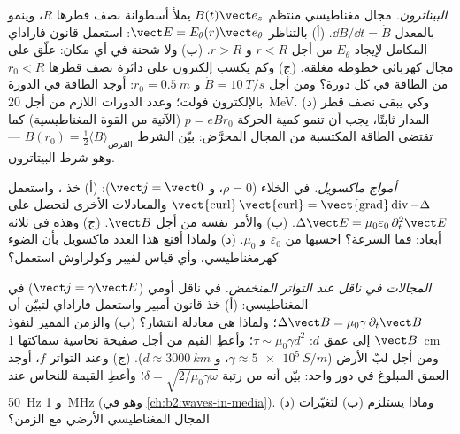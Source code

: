 \begin{exercise}[$\star\star\star$]\label{exo:b2:maxwell-equations:10}
\emph{البيتاترون.} مجال مغناطيسي منتظم $B(t)\vect e_z$ يملأ
أسطوانة نصف قطرها $R$، وينمو بالمعدل $\dd B/\dd t = \dot B$. (أ) بالتناظر
$\vect E = E_\theta(r)\vect e_\theta$: استعمل قانون فاراداي المكامل لإيجاد $E_\theta$
من أجل $r < R$ و $r > R$. (ب) ولا شحنة في أي مكان: علّق على
مجال كهربائي خطوطه مغلقة. (ج) وكم يكسب إلكترون على دائرة
نصف قطرها $r_0 < R$ من الطاقة في كل دورة؟ ومن أجل $\dot B = \qty{10}{T/s}$
و $r_0 = \qty{0.5}{m}$: أوجد الطاقة في الدورة بالإلكترون فولت؛ وعدد الدورات اللازم من أجل \qty{20}{MeV}.
(د) وكي يبقى نصف قطر المدار ثابتًا، يجب أن تنمو كمية الحركة $p = eBr_0$ (الآتية
من القوة المغناطيسية) كما تقتضي الطاقة المكتسبة من المجال المحرَّض:
بيّن الشرط $B(r_0) = \tfrac12\langle B\rangle_{\text{القرص}}$
--- وهو شرط البيتاترون.
\end{exercise}

\begin{exercise}[$\star\star\star$]\label{exo:b2:maxwell-equations:11}
\emph{أمواج ماكسويل.} في الخلاء ($\rho = 0$، و $\vect j = \vect 0$): (أ) خذ
 ، واستعمل $\operatorname{\vect{curl}}
\operatorname{\vect{curl}} = \operatorname{\vect{grad}}\operatorname{div} - \Delta$ والمعادلات
الأخرى لتحصل على $\Delta\vect E = \mu_0\varepsilon_0\,\partial_t^2\vect E$. (ب) والأمر نفسه من أجل
$\vect B$. (ج) وهذه  في ثلاثة أبعاد: فما السرعة؟
احسبها من $\varepsilon_0$ و $\mu_0$. (د) ولماذا أقنع هذا العدد
ماكسويل بأن الضوء كهرمغناطيسي، وأي قياس
لفيبر وكولراوش استعمل؟
\end{exercise}

\begin{exercise}[$\star\star\star$]\label{exo:b2:maxwell-equations:12}
\emph{المجالات في ناقل عند التواتر المنخفض.} في ناقل أومي
($\vect j = \gamma\vect E$) في  المغناطيسي: (أ) خذ
 قانون أمبير واستعمل فاراداي لتبيّن أن $\Delta\vect B = \mu_0\gamma\,
\partial_t\vect B$؛ ولماذا هي معادلة انتشار؟ (ب) والزمن المميز
لنفوذ $\vect B$ إلى عمق $d$: $\tau \sim \mu_0\gamma d^2$؛ وأعطِ القيم من أجل
صفيحة نحاسية سماكتها \qty{1}{cm} ومن أجل لبّ الأرض ($\gamma \approx \qty{5e5}{S/m}$،
و $d \approx \qty{3000}{km}$). (ج) وعند التواتر $f$، أوجد العمق المبلوغ في
دور واحد: بيّن أنه من رتبة $\delta = \sqrt{2/\mu_0\gamma\omega}$؛ وأعطِ القيمة للنحاس
عند \qty{50}{Hz} و \qty{1}{MHz} (وهو  في
\cref{ch:b2:waves-in-media}). (د) وماذا يستلزم (ب) لتغيّرات
المجال المغناطيسي الأرضي مع الزمن؟
\end{exercise}

